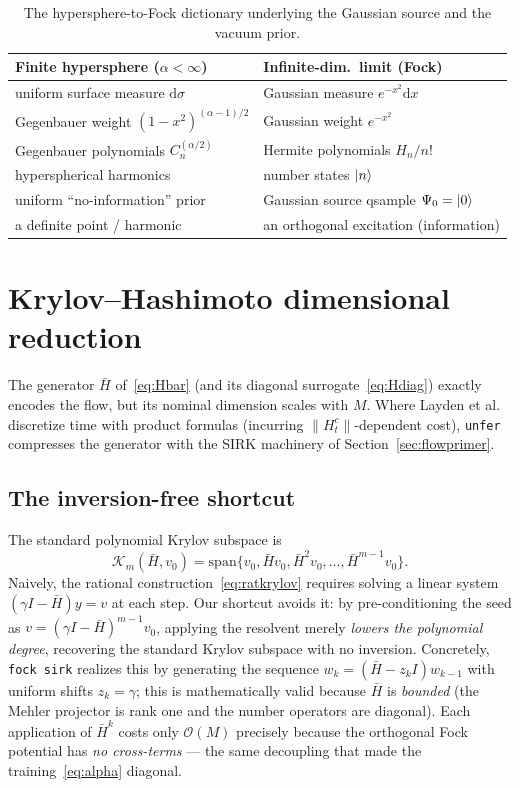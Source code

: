 \documentclass[11pt, a4paper]{article}
\newcommand{\Kry}{\mathcal{K}}
\begin{document}
\begin{table}[htbp]
\centering
\begin{tabular}{l|l}
\textbf{Finite hypersphere ($\alpha<\infty$)} & \textbf{Infinite-dim.\ limit (Fock)} \\
\hline
uniform surface measure $\mathrm{d}\sigma$ & Gaussian measure $e^{-x^2}\mathrm{d}x$ \\
Gegenbauer weight $(1-x^2)^{(\alpha-1)/2}$ & Gaussian weight $e^{-x^2}$
   \\
Gegenbauer polynomials $C_n^{(\alpha/2)}$ & Hermite polynomials $H_n/n!$
   \\
hyperspherical harmonics & number states $\ket{n}$ \\
uniform ``no-information'' prior & Gaussian source qsample $\Psi_0=\ket{0}$ \\
a definite point / harmonic & an orthogonal excitation (information) \\
\end{tabular}
\caption{The hypersphere-to-Fock dictionary underlying the Gaussian source and
the vacuum prior.}
\label{tab:dictionary}
\end{table}

\section{Krylov--Hashimoto dimensional reduction}
\label{sec:krylov}

The generator $\bar H$ of~\eqref{eq:Hbar} (and its diagonal
surrogate~\eqref{eq:Hdiag}) exactly encodes the flow, but its nominal dimension
scales with $M$. Where Layden et al.~\cite{Layden2025} discretize time with
product formulas (incurring $\|H_t^c\|$-dependent cost), \texttt{unfer}
compresses the generator with the SIRK machinery of
Section~\ref{sec:flowprimer}.

\subsection{The inversion-free shortcut}

The standard polynomial Krylov subspace is
\begin{equation}
  \Kry_m(\bar H,v_0)=\mathrm{span}\{v_0,\bar H v_0,\bar H^2 v_0,\dots,
  \bar H^{m-1}v_0\}.
\end{equation}
Naively, the rational construction~\eqref{eq:ratkrylov} requires solving a
linear system $(\gamma I-\bar H)y=v$ at each step. Our shortcut avoids it: by
pre-conditioning the seed as $v=(\gamma I-\bar H)^{m-1}v_0$, applying the
resolvent merely \emph{lowers the polynomial degree}, recovering the standard
Krylov subspace with no inversion. Concretely, \texttt{fock\textunderscore
sirk} realizes this by generating the sequence $w_k=(\bar H-z_kI)w_{k-1}$ with
uniform shifts $z_k=\gamma$; this is mathematically valid because $\bar H$ is
\emph{bounded} (the Mehler projector is rank one and the number operators are
diagonal). Each application of $\bar H^k$ costs only $\mathcal{O}(M)$ precisely
because the orthogonal Fock potential has \emph{no cross-terms} --- the same
decoupling that made the training~\eqref{eq:alpha} diagonal.
\end{document}
